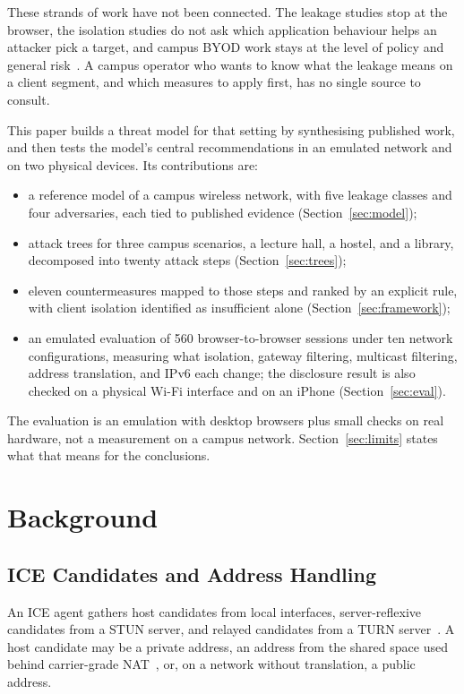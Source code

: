 \documentclass[conference]{IEEEtran}
\begin{document}
These strands of work have not been connected. The leakage studies stop at the browser, the isolation studies do not ask which application behaviour helps an attacker pick a target, and campus BYOD work stays at the level of policy and general risk~\cite{tchao2017}. A campus operator who wants to know what the leakage means on a client segment, and which measures to apply first, has no single source to consult.

This paper builds a threat model for that setting by synthesising published work, and then tests the model's central recommendations in an emulated network and on two physical devices. Its contributions are:
\begin{itemize}
\item a reference model of a campus wireless network, with five leakage classes and four adversaries, each tied to published evidence (Section~\ref{sec:model});
\item attack trees for three campus scenarios, a lecture hall, a hostel, and a library, decomposed into twenty attack steps (Section~\ref{sec:trees});
\item eleven countermeasures mapped to those steps and ranked by an explicit rule, with client isolation identified as insufficient alone (Section~\ref{sec:framework});
\item an emulated evaluation of 560 browser-to-browser sessions under ten network configurations, measuring what isolation, gateway filtering, multicast filtering, address translation, and IPv6 each change; the disclosure result is also checked on a physical Wi-Fi interface and on an iPhone (Section~\ref{sec:eval}).
\end{itemize}
The evaluation is an emulation with desktop browsers plus small checks on real hardware, not a measurement on a campus network. Section~\ref{sec:limits} states what that means for the conclusions.

\section{Background}
\label{sec:background}
\subsection{ICE Candidates and Address Handling}
An ICE agent gathers host candidates from local interfaces, server-reflexive candidates from a STUN server, and relayed candidates from a TURN server~\cite{rfc8445,rfc8489}. A host candidate may be a private address, an address from the shared space used behind carrier-grade NAT~\cite{rfc6598}, or, on a network without translation, a public address.
\end{document}
